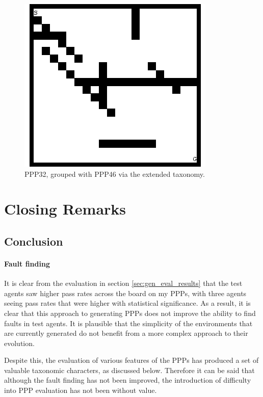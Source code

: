 \documentclass[authoryearcitations]{UoYCSproject}
\begin{document}
\begin{figure}[H]
\graphicspath{ {EvalPics/} }
\includegraphics[scale=0.65]{ppp32.png}
\caption{PPP32, grouped with PPP46 via the extended taxonomy.}
\label{fig:ppp_32}
\end{figure}

\part{Closing Remarks}
\label{sec:close}
\chapter{Conclusion}
\label{cha:conclusion}
\subsection{Fault finding}
\label{sec:conc_fault}
It is clear from the evaluation in section \ref{sec:gen_eval_results} that the test agents saw higher pass rates across the board on my PPPs, with three agents seeing pass rates that were higher with statistical significance. As a result, it is clear that this approach to generating PPPs does not improve the ability to find faults in test agents. It is plausible that the simplicity of the environments that are currently generated do not benefit from a more complex approach to their evolution.

Despite this, the evaluation of various features of the PPPs has produced a set of valuable taxonomic characters, as discussed below. Therefore it can be said that although the fault finding has not been improved, the introduction of difficulty into PPP evaluation has not been without value.
\end{document}

